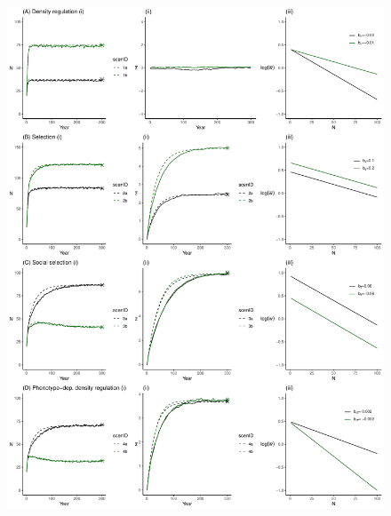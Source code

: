\documentclass{article}
\begin{document}
	\newpage
	\begin{figure} [H]
	\renewcommand{\figurename}{Figure }
		\centering
		\includegraphics[width=12cm, height=16cm]{Figures/Fig3.pdf}

\end{figure}
\end{document}
